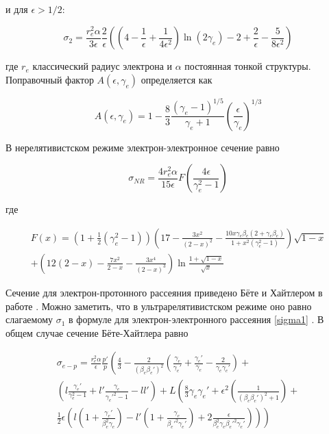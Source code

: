 и для $\epsilon > 1/2$:

\begin{equation}
	\sigma_2 = \frac{r_e^2\alpha}{3\epsilon}\frac{2}{\epsilon}\left(\left(4-\frac{1}{\epsilon}+\frac{1}{4\epsilon^2}\right)\ln\left(2\gamma_e\right)-2+\frac{2}{\epsilon}-\frac{5}{8\epsilon^2}\right)
\end{equation}

где $r_e$ классический радиус электрона и $\alpha$ постоянная тонкой структуры. Поправочный фактор $A(\epsilon, \gamma_e)$ определяется как

\begin{equation}
	A\left(\epsilon, \gamma_e\right)=1-\frac{8}{3}\frac{\left(\gamma_e-1\right)^{1/5}}{\gamma_e + 1}\left(\frac{\epsilon}{\gamma_e}\right)^{1/3}
\end{equation}

В нерелятивистском режиме электрон-электронное сечение равно

\begin{equation}
	\sigma_{NR}=\frac{4r_e^2\alpha}{15\epsilon}F\left(\frac{4\epsilon}{\gamma_e^2-1}\right)
\end{equation}

где

\begin{equation}
	\begin{split}
		F(x) = \left(1+\frac{1}{2}\left(\gamma_e^2-1\right)\right)\left(17-\frac{3x^2}{\left(2-x\right)^2}-\frac{10x\gamma_e\beta_e\left(2+\gamma_e\beta_e\right)}{1+x^2\left(\gamma_e^2-1\right)}\right)\sqrt{1-x} \\ +\left(12\left(2-x\right)-\frac{7x^2}{2-x}-\frac{3x^4}{\left(2-x\right)^3}\right)\ln\frac{1+\sqrt{1-x}}{\sqrt{x}}
	\end{split}
\end{equation}

Сечение для электрон-протонного рассеяния приведено Бёте и Хайтлером в работе \cite{BetheHeitler}. Можно заметить, что в ультрарелятивистском режиме оно равно слагаемому $\sigma_1$ в формуле для электрон-электронного рассеяния \ref{sigma1} \cite{JauchRohrlich}. В общем случае сечение Бёте-Хайтлера равно

\begin{equation}
	\begin{split}
		\sigma_{e-p} = \frac{r_e^2\alpha}{\epsilon}\frac{p'}{p}\left(\frac{4}{3}-\frac{2}{\left(\beta_e\beta_e'\right)^2}\left(\frac{\gamma_e}{\gamma_e'}+\frac{\gamma_e'}{\gamma_e}-\frac{2}{\gamma_e\gamma_e'}\right) + \right. \\ \left. \left(l\frac{\gamma_e'}{\gamma_e^2-1}+l'\frac{\gamma_e}{\gamma_e'^2-1}-l l'\right) + L\left(\frac{8}{3}\gamma_e\gamma_e'+\epsilon^2\left(\frac{1}{\left(\beta_e\beta_e'\right)^2+1}\right)+ \right. \right. \\ \left. \left. \frac{1}{2}\epsilon\left(l\left(1+\frac{\gamma_e'}{\beta_e^2\gamma_e}\right)-l'\left(1+\frac{\gamma_e}{\beta_e'^2\gamma_e'}\right)+2\frac{\epsilon}{\beta_e^2\gamma_e\beta_e'^2\gamma_e'}\right)\right)\right)
	\end{split}
\end{equation}

